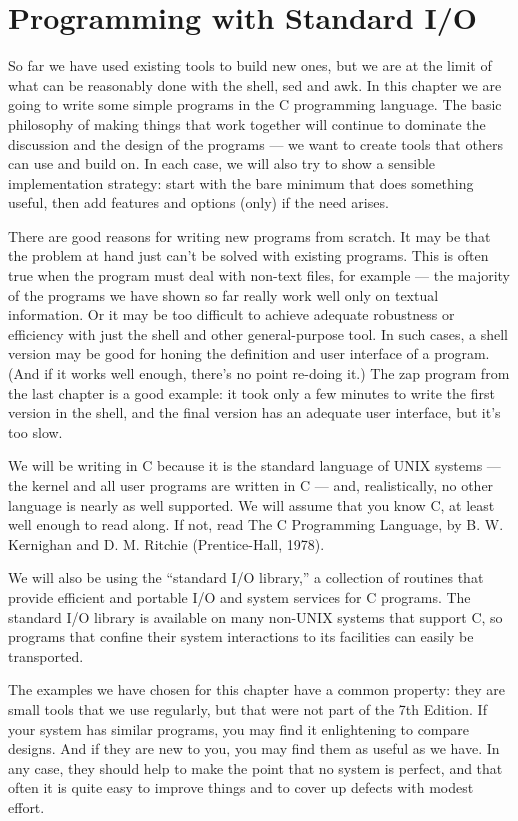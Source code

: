 \chapter{Programming with Standard I/O}
So far we have used existing tools to build new ones, but we are at the limit of
what can be reasonably done with the shell, sed and awk. In this chapter we are
going to write some simple programs in the C programming language. The basic
philosophy of making things that work together will continue to dominate the
discussion and the design of the programs --- we want to create tools that
others can use and build on. In each case, we will also try to show a sensible
implementation strategy: start with the bare minimum that does something useful,
then add features and options (only) if the need arises.

There are good reasons for writing new programs from scratch. It may be that the
problem at hand just can't be solved with existing programs. This is often true
when the program must deal with non-text files, for example --- the majority of
the programs we have shown so far really work well only on textual
information. Or it may be too difficult to achieve adequate robustness or
efficiency with just the shell and other general-purpose tool. In such cases, a
shell version may be good for honing the definition and user interface of a
program. (And if it works well enough, there's no point re-doing it.) The zap
program from the last chapter is a good example: it took only a few minutes to
write the first version in the shell, and the final version has an adequate user
interface, but it's too slow.

We will be writing in C because it is the standard language of UNIX systems ---
the kernel and all user programs are written in C --- and, realistically, no
other language is nearly as well supported. We will assume that you know C, at
least well enough to read along. If not, read The C Programming Language, by
B. W. Kernighan and D. M. Ritchie (Prentice-Hall, 1978).

We will also be using the ``standard I/O library,'' a collection of routines
that provide efficient and portable I/O and system services for C programs. The
standard I/O library is available on many non-UNIX systems that support C, so
programs that confine their system interactions to its facilities can easily be
transported.

The examples we have chosen for this chapter have a common property: they are
small tools that we use regularly, but that were not part of the 7th Edition. If
your system has similar programs, you may find it enlightening to compare
designs. And if they are new to you, you may find them as useful as we have. In
any case, they should help to make the point that no system is perfect, and that
often it is quite easy to improve things and to cover up defects with modest
effort.

